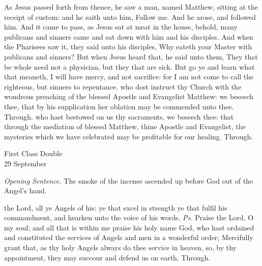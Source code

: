  As Jesus passed forth from thence, he saw a man, named Matthew, sitting at the receipt of custom: and he saith unto him, Follow me. And he arose, and followed him. And it came to pass, as Jesus sat at meat in the house, behold, many publicans and sinners came and sat down with him and his disciples. And when the Pharisees saw it, they said unto his disciples, Why eateth your Master with publicans and sinners? But when Jesus heard that, he said unto them, They that be whole need not a physician, but they that are sick. But go ye and learn what that meaneth, I will have mercy, and not sacrifice: for I am not come to call the righteous, but sinners to repentance.
\secret
{} who dost instruct thy Church with the wondrous preaching of the blessed Apostle and Evangelist Matthew: we beseech thee, that by his supplication her oblation may be commended unto thee. Through.
\postcommunion
{} who hast bestowed on us thy sacraments, we beseech thee: that through the mediation of blessed Matthew, thine Apostle and Evangelist, the mysteries which we have celebrated may be profitable for our healing. Through.


\begin{inhead}
    {First Class Double\\
29 September}
\end{inhead}
\par\noindent
\textit{Opening Sentence.} The smoke of the incense ascended up before God out of the Angel's hand.



\introit
{} the Lord, all ye Angels of his: ye that excel in strength ye that fulfil his commandment, and hearken unto the voice of his words. \textit{Ps.} Praise the Lord, O my soul; and all that is within me praise his holy name
\collect
{} God, who hast ordained and constituted the services of Angels and men in a wonderful order; Mercifully grant that, as thy holy Angels always do thee service in heaven, so, by thy appointment, they may succour and defend us on earth. Through.

